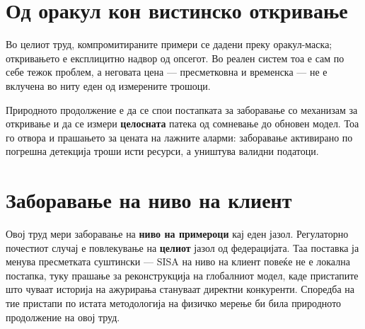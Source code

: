 \section{Од оракул кон вистинско откривање}

Во целиот труд, компромитираните примери се дадени преку оракул-маска; откривањето е
експлицитно надвор од опсегот. Во реален систем тоа е сам по себе тежок проблем, а неговата
цена --- пресметковна и временска --- не е вклучена во ниту еден од измерените трошоци.

Природното продолжение е да се спои постапката за заборавање со механизам за откривање и да
се измери \textbf{целосната} патека од сомневање до обновен модел. Тоа го отвора и прашањето за
цената на лажните аларми: заборавање активирано по погрешна детекција троши исти ресурси, а
уништува валидни податоци.

\section{Заборавање на ниво на клиент}

Овој труд мери заборавање на \textbf{ниво на примероци} кај еден јазол. Регулаторно почестиот
случај е повлекување на \textbf{целиот} јазол од федерацијата. Таа поставка ја менува
пресметката суштински --- SISA на ниво на клиент повеќе не е локална постапка, туку прашање за
реконструкција на глобалниот модел, каде пристапите што чуваат историја на ажурирања
\cite{liu2021federaser, cao2023fedrecover} стануваат директни конкуренти. Споредба на тие
пристапи по истата методологија на физичко мерење би била природното продолжение на овој
труд.
